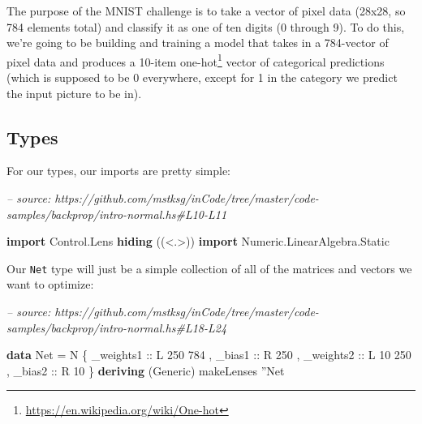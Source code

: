 \documentclass[]{article}
\newenvironment{Shaded}{}{}
\newcommand{\CommentTok}[1]{\textcolor[rgb]{0.38,0.63,0.69}{\textit{#1}}}
\newcommand{\DataTypeTok}[1]{\textcolor[rgb]{0.56,0.13,0.00}{#1}}
\newcommand{\DecValTok}[1]{\textcolor[rgb]{0.25,0.63,0.44}{#1}}
\newcommand{\FunctionTok}[1]{\textcolor[rgb]{0.02,0.16,0.49}{#1}}
\newcommand{\KeywordTok}[1]{\textcolor[rgb]{0.00,0.44,0.13}{\textbf{#1}}}
\newcommand{\NormalTok}[1]{#1}
\newcommand{\OtherTok}[1]{\textcolor[rgb]{0.00,0.44,0.13}{#1}}
\renewcommand{\href}[2]{#2\footnote{\url{#1}}}
\begin{document}
The purpose of the MNIST challenge is to take a vector of pixel data (28x28, so
784 elements total) and classify it as one of ten digits (0 through 9). To do
this, we're going to be building and training a model that takes in a 784-vector
of pixel data and produces a 10-item
\href{https://en.wikipedia.org/wiki/One-hot}{one-hot} vector of categorical
predictions (which is supposed to be 0 everywhere, except for 1 in the category
we predict the input picture to be in).

\hypertarget{types}{%
\subsection{Types}\label{types}}

For our types, our imports are pretty simple:

\begin{Shaded}
\begin{Highlighting}[]
\CommentTok{-- source: https://github.com/mstksg/inCode/tree/master/code-samples/backprop/intro-normal.hs#L10-L11}

\KeywordTok{import}           \DataTypeTok{Control.Lens} \KeywordTok{hiding}\NormalTok{          ((<.>))}
\KeywordTok{import}           \DataTypeTok{Numeric.LinearAlgebra.Static}
\end{Highlighting}
\end{Shaded}

Our \texttt{Net} type will just be a simple collection of all of the matrices
and vectors we want to optimize:

\begin{Shaded}
\begin{Highlighting}[]
\CommentTok{-- source: https://github.com/mstksg/inCode/tree/master/code-samples/backprop/intro-normal.hs#L18-L24}

\KeywordTok{data} \DataTypeTok{Net} \FunctionTok{=} \DataTypeTok{N}\NormalTok{ \{}\OtherTok{ _weights1 ::} \DataTypeTok{L} \DecValTok{250} \DecValTok{784}
\NormalTok{             ,}\OtherTok{ _bias1    ::} \DataTypeTok{R} \DecValTok{250}
\NormalTok{             ,}\OtherTok{ _weights2 ::} \DataTypeTok{L} \DecValTok{10} \DecValTok{250}
\NormalTok{             ,}\OtherTok{ _bias2    ::} \DataTypeTok{R} \DecValTok{10}
\NormalTok{             \}}
  \KeywordTok{deriving}\NormalTok{ (}\DataTypeTok{Generic}\NormalTok{)}
\NormalTok{makeLenses ''}\DataTypeTok{Net}
\end{Highlighting}
\end{Shaded}
\end{document}
